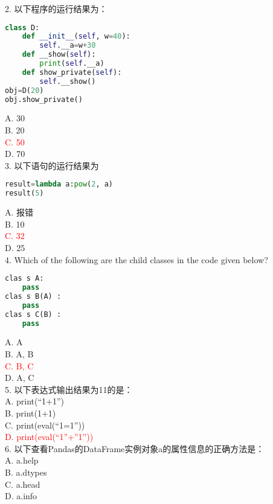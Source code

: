 \documentclass[6pt]{article}
\begin{document}
2. 以下程序的运行结果为：\\

\begin{lstlisting}[language=Python]
class D:
    def __init__(self, w=40):
        self.__a=w+30
    def __show(self):
        print(self.__a)
    def show_private(self):
        self.__show()
obj=D(20)
obj.show_private()
\end{lstlisting}

A. 30\\
B. 20\\
\textcolor{red}{C. 50}\\
D. 70\\

3. 以下语句的运行结果为\\

\begin{lstlisting}[language=Python]
result=lambda a:pow(2, a)
result(5)
\end{lstlisting}
A. 报错\\
B. 10\\
\textcolor{red}{C. 32}\\
D. 25\\

4. Which of the following are the child classes in the code given below?\\
\begin{lstlisting}[language=Python]
clas s A:
	pass
clas s B(A) :
	pass
clas s C(B) :
	pass
\end{lstlisting}
A. A \\
B. A, B\\
\textcolor{red}{C. B, C}\\
D. A, C\\

5. 以下表达式输出结果为11的是：\\

A. print(“1+1”)\\
B. print(1+1)\\
C. print(eval(“1=1”))\\
\textcolor{red}{D. print(eval(“1”+”1”))}\\

6. 以下查看Pandas的DataFrame实例对象a的属性信息的正确方法是：\\

A. a.help\\
B. a.dtypes\\
C. a.head\\
D. a.info\\
\end{document}
